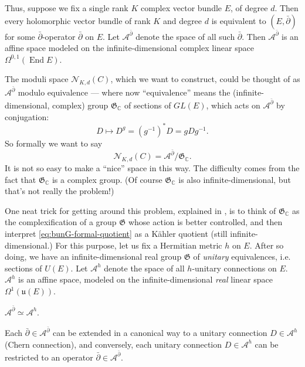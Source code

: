 \documentclass[12pt,letterpaper,reqno]{article}
\numberwithin{equation}{section}
\newcommand{\fu}{{\mathfrak u}}
\newcommand{\fG}{{\mathfrak G}}
\newcommand{\cN}{\ensuremath{\mathcal N}}
\newcommand{\cA}{\ensuremath{\mathcal A}}
\newcommand{\C}{\ensuremath{\mathbb C}}
\newcommand{\kahler}{K\"ahler\xspace}
\newcommand{\ti}[1]{\textit{#1}}
\DeclareMathOperator{\End}{End}
\begin{document}
Thus, suppose we fix a single rank $K$ complex vector bundle $E$,
of degree $d$. Then every holomorphic vector bundle of rank $K$
and degree $d$ is equivalent to $(E, \bar\partial)$ for some
$\bar\partial$-operator $\bar\partial$ on $E$.
Let $\cA^{\bar\partial}$ denote the space of all such $\bar\partial$.
Then $\cA^{\bar\partial}$ is an affine space modeled on the
infinite-dimensional complex linear space $\Omega^{0,1}(\End E)$.

The moduli space $\cN_{K,d}(C)$, which we want to construct,
could be thought of as
$\cA^{\bar\partial}$ modulo equivalence --- where now ``equivalence'' means
the (infinite-dimensional,
complex) group $\fG_\C$ of sections of $GL(E)$,
which acts on $\cA^{\bar\partial}$ by conjugation:
\begin{equation}
  D \mapsto D^g = (g^{-1})^* D = g D g^{-1}.
\end{equation}
So formally we want to say
\begin{equation} \label{eq:bunG-formal-quotient}
  \cN_{K,d}(C) = \cA^{\bar\partial} / \fG_\C.
\end{equation}
It is not so easy to make a ``nice'' space in this way.
The difficulty comes from the
fact that $\fG_\C$ is a complex group.
(Of course $\fG_\C$ is also infinite-dimensional,
but that's not really the problem!)

One neat trick for getting around this problem,
explained in \cite{MR85k:14006},
is to think of $\fG_\C$ as the complexification of a
group $\fG$ whose action is better controlled, and
then interpret \eqref{eq:bunG-formal-quotient}
as a \kahler quotient (still infinite-dimensional.)
For this purpose, let us fix a Hermitian metric $h$ on $E$.
After so doing, we have an infinite-dimensional real group
$\fG$ of \ti{unitary} equivalences, i.e. sections of $U(E)$.
Let $\cA^h$ denote the space of all $h$-unitary connections
on $E$.
$\cA^h$ is an affine space, modeled
on the infinite-dimensional \ti{real} linear space $\Omega^{1}(\fu(E))$.

\begin{prop}[Unitary connections = holomorphic structures]
$\cA^{\bar\partial} \simeq \cA^h$.
\end{prop}
\begin{pf} Each $\bar\partial \in \cA^{\bar\partial}$
can be extended in a canonical way to a unitary connection $D \in \cA^h$
(Chern connection), and conversely, each unitary connection $D \in \cA^h$
can be restricted to an operator $\bar\partial \in \cA^{\bar\partial}$.
\end{pf}
\end{document}
